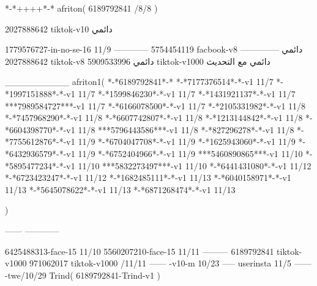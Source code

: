 *-*++++*-*
afriton(
6189792841 /8/8
)

2027888642 tiktok-v10
دائمي

1779576727-in-no-se-16 11/9
------------
5754454119 facbook-v8
دائمي
--------------
2027888642 tiktok-v8
دائمي
5909533996 tiktok-v1000
دائمي مع التحديث

__________
afriton1(
*-*6189792841*-*
*-*7177376514*-*-v1 11/7
*-*1997151888*-*-v1 11/7
*-*1599846230*-*-v1 11/7
*-*1431921137*-*-v1 11/7
***7989584727***-v1 11/7
*-*6166078500*-*-v1 11/7
*-*2105331982*-*-v1 11/8
*-*7457968290*-*-v1 11/8
*-*6607742807*-*-v1 11/8
*-*1213144842*-*-v1 11/8
*-*6604398770*-*-v1 11/8
***5796443586***-v1 11/8
*-*827296278*-*-v1 11/8
*-*7755612876*-*-v1 11/9
*-*6704047708*-*-v1 11/9
*-*1625943060*-*-v1 11/9
*-*6432936579*-*-v1 11/9
*-*6752404966*-*-v1 11/9
***5460890865***-v1 11/10
*-*5895477234*-*-v1 11/10
***5832273497***-v1 11/10
*-*6441431080*-*-v1 11/12
*-*6723423247*-*-v1 11/12
*-*1682485111*-*-v1 11/13
*-*6040158971*-*-v1 11/13
*-*5645078622*-*-v1 11/13
*-*6871268474*-*-v1 11/13

)

------
------------

6425488313-face-15 11/10
5560207210-face-15 11/11
---------
6189792841 tiktok-v1000
971062017 tiktok-v1000 /11/11
------
-v10-m 10/23
-----
userinsta 11/5
------
-twe/10/29
Trind(
6189792841-Trind-v1 
)
